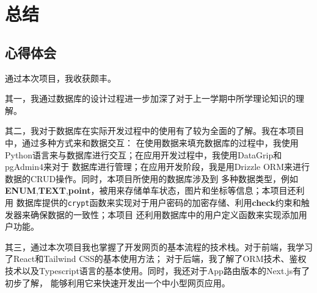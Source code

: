 \chapter{总结}
\thispagestyle{empty}
\section{心得体会}
通过本次项目，我收获颇丰。

其一，我通过数据库的设计过程进一步加深了对于上一学期中所学理论知识的理解。

其二，我对于数据库在实际开发过程中的使用有了较为全面的了解。我在本项目中，通过多种方式来和数据交互：
在使用数据来填充数据库的过程中，我使用Python语言来与数据库进行交互；在应用开发过程中，我使用DataGrip和pgAdmin4来对于
数据库进行管理；在应用开发阶段，我是用Drizzle ORM来进行数据的CRUD操作。同时，本项目所使用的数据库涉及到
多种数据类型，例如\textbf{ENUM},\textbf{TEXT},\textbf{point}，被用来存储单车状态，图片和坐标等信息；本项目还利用
数据库提供的\verb|crypt|函数来实现对于用户密码的加密存储、利用\textbf{check}约束和触发器来确保数据的一致性；本项目
还利用数据库中的用户定义函数来实现添加用户功能。

其三，通过本次项目我也掌握了开发网页的基本流程的技术栈。对于前端，我学习了React和Tailwind CSS的基本使用方法；
对于后端，我了解了ORM技术、鉴权技术以及Typescript语言的基本使用。同时，我还对于App路由版本的Next.js有了初步了解，
能够利用它来快速开发出一个中小型网页应用。